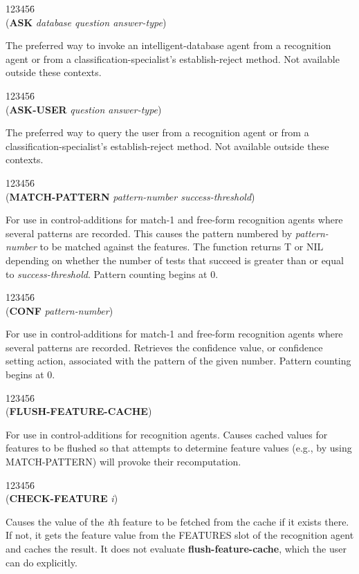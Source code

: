 \begin{tabbing}
123456\= \kill
\\
({\bf ASK} {\it database question answer-type\/})
\end{tabbing}
The preferred way to invoke an intelligent-database agent from a
recognition agent or from a classification-specialist's
establish-reject method. Not available outside these contexts.

\begin{tabbing}
123456\= \kill
\\
({\bf ASK-USER} {\it question answer-type\/})
\end{tabbing}
The preferred way to query the user from a recognition agent or from a
classification-specialist's establish-reject method. Not available
outside these contexts.

\begin{tabbing}
123456\= \kill
\\
({\bf MATCH-PATTERN} {\it pattern-number success-threshold\/})
\end{tabbing}
For use in control-additions for match-1 and free-form recognition
agents where several patterns are recorded.  This causes the pattern
numbered by {\it pattern-number\/} to be matched against the features.
The function returns T or NIL depending on whether the number of tests
that succeed is greater than or equal to {\it success-threshold\/}.
Pattern counting begins at 0.

\begin{tabbing}
123456\= \kill
\\
({\bf CONF} {\it pattern-number\/})
\end{tabbing}
For use in control-additions for match-1 and free-form recognition
agents where several patterns are recorded.  Retrieves the confidence
value, or confidence setting action, associated with the pattern of
the given number.  Pattern counting begins at 0.

\begin{tabbing}
123456\= \kill
\\
({\bf FLUSH-FEATURE-CACHE})
\end{tabbing}
For use in control-additions for recognition agents.  Causes cached
values for features to be flushed so that attempts to determine
feature values (e.g., by using MATCH-PATTERN) will provoke their
recomputation.

\begin{tabbing}
123456\= \kill
\\
({\bf CHECK-FEATURE} {\it i\/})
\end{tabbing}
Causes the value of the {\it i\/}th feature to be fetched from the cache
if it exists there.  If not, it gets the feature value from the
FEATURES slot of the recognition agent and caches the result.  It
does not evaluate {\bf flush-feature-cache}, which the user can do explicitly.

